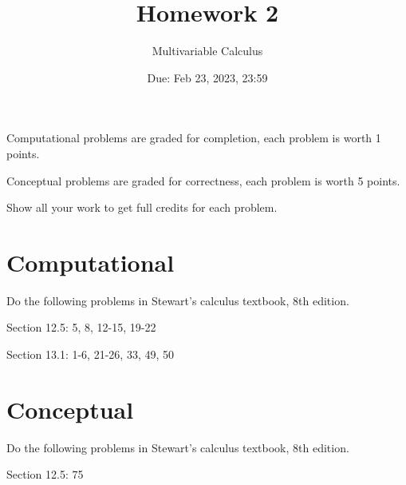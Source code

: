 \documentclass[12pt]{article}
\title{Homework 2}
\author{ Multivariable Calculus}
\date{Due: Feb 23, 2023, 23:59}
\theoremstyle{definition}
\begin{document}
\maketitle

Computational problems are graded for completion, each problem is worth 1 points.

Conceptual problems are graded for correctness, each problem is worth 5 points.

Show all your work to get full credits for each problem.
\section{Computational}
Do the following problems in Stewart's calculus textbook, 8th edition.

Section 12.5: 5, 8, 12-15, 19-22

Section 13.1:  1-6, 21-26, 33, 49, 50

\section{Conceptual}
Do the following problems in Stewart's calculus textbook, 8th edition.

Section 12.5: 75


%
\end{document}
